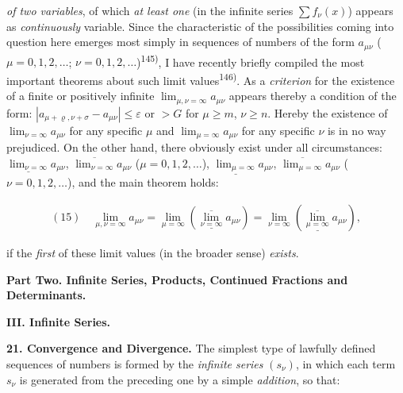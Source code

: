 \thispagestyle{fancy}

\vspace{0.5cm}

\textit{of two variables}, of which \textit{at least one} (in the infinite series $\sum f_\nu(x)$) appears as \textit{continuously} variable. Since the characteristic of the possibilities coming into question here emerges most simply in sequences of numbers of the form $a_{\mu\nu}$ ($\mu = 0, 1, 2, \ldots$; $\nu = 0, 1, 2, \ldots$)\textsuperscript{145)}, I have recently briefly compiled the most important theorems about such limit values\textsuperscript{146)}. As a \textit{criterion} for the existence of a finite or positively infinite $\lim_{\mu,\nu=\infty} a_{\mu\nu}$ appears thereby a condition of the form: $|a_{\mu+\varrho, \nu+\sigma} - a_{\mu\nu}| \le \varepsilon$ or $> G$ for $\mu \geq m$, $\nu \geq n$. Hereby the existence of $\lim_{\nu=\infty} a_{\mu\nu}$ for any specific $\mu$ and $\lim_{\mu=\infty} a_{\mu\nu}$ for any specific $\nu$ is in no way prejudiced. On the other hand, there obviously exist under all circumstances: $\underline{\lim_{\nu=\infty}} a_{\mu\nu}$, $\overline{\lim_{\nu=\infty}} a_{\mu\nu}$ ($\mu = 0, 1, 2, \ldots$), $\underline{\lim_{\mu=\infty}} a_{\mu\nu}$,  $\overline{\lim_{\mu=\infty}} a_{\mu\nu}$ ($\nu = 0, 1, 2, \ldots$), and the main theorem holds:

\vspace{-0.5cm}
\begin{align}
    (15) \quad \lim_{\mu,\nu=\infty} a_{\mu\nu} = \lim_{\mu=\infty} (\underline{\overline{\lim_{\nu=\infty}}} a_{\mu\nu}) = \lim_{\nu=\infty} (\underline{\overline{\lim_{\mu=\infty}}} a_{\mu\nu}),
\end{align}

if the \textit{first} of these limit values (in the broader sense) \textit{exists}.

\vspace{0.4cm}
\begin{center}
    \textbf{Part Two. Infinite Series, Products, Continued Fractions and Determinants.}
    
\vspace{0.2cm}
\textbf{III. Infinite Series.}
\end{center}

\textbf{21. Convergence and Divergence.} The simplest type of lawfully defined sequences of numbers is formed by the \textit{infinite series} $(s_\nu)$, in which each term $s_\nu$ is generated from the preceding one by a simple \textit{addition}, so that:

